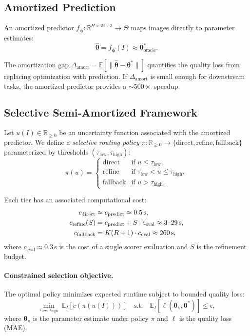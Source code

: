 \documentclass[11pt,a4paper]{article}
\newcommand{\btheta}{\boldsymbol{\theta}}
\newcommand{\bphi}{\boldsymbol{\phi}}
\newcommand{\Real}{\mathbb{R}}
\newcommand{\Expect}{\mathbb{E}}
\begin{document}
\subsection{Amortized Prediction}

An amortized predictor $f_{\bphi}: \Real^{H \times W \times 3} \to \Theta$ maps
images directly to parameter estimates:
\begin{equation}
\hat{\btheta} = f_{\bphi}(I) \approx \btheta^*_\text{oracle}.
\end{equation}

The amortization gap $\Delta_\text{amort} = \Expect[\|\hat{\btheta} - \btheta^*\|]$
quantifies the quality loss from replacing optimization with prediction.
If $\Delta_\text{amort}$ is small enough for downstream tasks,
the amortized predictor provides a ${\sim}500\times$ speedup.

\subsection{Selective Semi-Amortized Framework}

Let $u(I) \in \Real_{\geq 0}$ be an uncertainty function associated with
the amortized predictor. We define a \emph{selective routing policy}
$\pi: \Real_{\geq 0} \to \{\text{direct}, \text{refine}, \text{fallback}\}$
parameterized by thresholds $(\tau_\text{low}, \tau_\text{high})$:
\begin{equation}
\pi(u) = \begin{cases}
\text{direct} & \text{if } u \leq \tau_\text{low}, \\
\text{refine} & \text{if } \tau_\text{low} < u \leq \tau_\text{high}, \\
\text{fallback} & \text{if } u > \tau_\text{high}.
\end{cases}
\label{eq:routing}
\end{equation}

Each tier has an associated computational cost:
\begin{align}
c_\text{direct} &\approx c_\text{predict} \approx 0.5\text{\,s}, \\
c_\text{refine}(S) &= c_\text{predict} + S \cdot c_\text{eval} \approx 3\text{--}29\text{\,s}, \\
c_\text{fallback} &= K(R+1) \cdot c_\text{eval} \approx 260\text{\,s},
\end{align}
where $c_\text{eval} \approx 0.3$\,s is the cost of a single scorer evaluation
and $S$ is the refinement budget.

\paragraph{Constrained selection objective.}
The optimal policy minimizes expected runtime subject to bounded quality loss:
\begin{equation}
\min_{\tau_\text{low}, \tau_\text{high}} \; \Expect_I[c(\pi(u(I)))]
\quad \text{s.t.} \quad \Expect_I[\ell(\btheta_{\pi}, \btheta^*)] \leq \epsilon,
\label{eq:constrained}
\end{equation}
where $\btheta_\pi$ is the parameter estimate under policy $\pi$
and $\ell$ is the quality loss (MAE).
\end{document}
